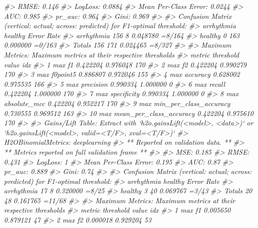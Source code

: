 \documentclass[]{book}
\newenvironment{Shaded}{\begin{snugshade}}{\end{snugshade}}
\newcommand{\CommentTok}[1]{\textcolor[rgb]{0.56,0.35,0.01}{\textit{#1}}}
\begin{document}
\begin{Shaded}
\begin{Highlighting}[]
{{{{{{\CommentTok{#> RMSE:  0.146}
\CommentTok{#> LogLoss:  0.0884}
\CommentTok{#> Mean Per-Class Error:  0.0244}
\CommentTok{#> AUC:  0.985}
\CommentTok{#> pr_auc:  0.964}
\CommentTok{#> Gini:  0.969}
\CommentTok{#> }
\CommentTok{#> Confusion Matrix (vertical: actual; across: predicted) for F1-optimal threshold:}
\CommentTok{#>            arrhythmia healthy    Error    Rate}
\CommentTok{#> arrhythmia        156       8 0.048780  =8/164}
\CommentTok{#> healthy             0     163 0.000000  =0/163}
\CommentTok{#> Totals            156     171 0.024465  =8/327}
\CommentTok{#> }
\CommentTok{#> Maximum Metrics: Maximum metrics at their respective thresholds}
\CommentTok{#>                         metric threshold    value idx}
\CommentTok{#> 1                       max f1  0.422204 0.976048 170}
\CommentTok{#> 2                       max f2  0.422204 0.990279 170}
\CommentTok{#> 3                 max f0point5  0.886807 0.972046 155}
\CommentTok{#> 4                 max accuracy  0.628002 0.975535 166}
\CommentTok{#> 5                max precision  0.990334 1.000000   0}
\CommentTok{#> 6                   max recall  0.422204 1.000000 170}
\CommentTok{#> 7              max specificity  0.990334 1.000000   0}
\CommentTok{#> 8             max absolute_mcc  0.422204 0.952217 170}
\CommentTok{#> 9   max min_per_class_accuracy  0.730555 0.969512 163}
\CommentTok{#> 10 max mean_per_class_accuracy  0.422204 0.975610 170}
\CommentTok{#> }
\CommentTok{#> Gains/Lift Table: Extract with `h2o.gainsLift(<model>, <data>)` or `h2o.gainsLift(<model>, valid=<T/F>, xval=<T/F>)`}
\CommentTok{#> H2OBinomialMetrics: deeplearning}
\CommentTok{#> ** Reported on validation data. **}
\CommentTok{#> ** Metrics reported on full validation frame **}
\CommentTok{#> }
\CommentTok{#> MSE:  0.185}
\CommentTok{#> RMSE:  0.431}
\CommentTok{#> LogLoss:  1}
\CommentTok{#> Mean Per-Class Error:  0.195}
\CommentTok{#> AUC:  0.87}
\CommentTok{#> pr_auc:  0.889}
\CommentTok{#> Gini:  0.74}
\CommentTok{#> }
\CommentTok{#> Confusion Matrix (vertical: actual; across: predicted) for F1-optimal threshold:}
\CommentTok{#>            arrhythmia healthy    Error    Rate}
\CommentTok{#> arrhythmia         17       8 0.320000   =8/25}
\CommentTok{#> healthy             3      40 0.069767   =3/43}
\CommentTok{#> Totals             20      48 0.161765  =11/68}
\CommentTok{#> }
\CommentTok{#> Maximum Metrics: Maximum metrics at their respective thresholds}
\CommentTok{#>                         metric threshold    value idx}
\CommentTok{#> 1                       max f1  0.005650 0.879121  47}
\CommentTok{#> 2                       max f2  0.000018 0.929204  53}
}}}}}}
\end{Highlighting}
\end{Shaded}
\end{document}
